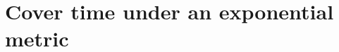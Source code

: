 \documentclass[11pt, reqno]{amsart}
\theoremstyle{plain}%
\theoremstyle{definition}
\theoremstyle{definition}
\def\U{\ensuremath{\mathcal U}}
\def\O{\ensuremath{O}}
\def\E{\mathbb E}
\def\st{such that }
\def\ulx{\underline{x}}
\numberwithin{equation}{section}
\begin{document}



\section{Cover time under an exponential metric}\label{Section: exponential metric}
\end{document}
